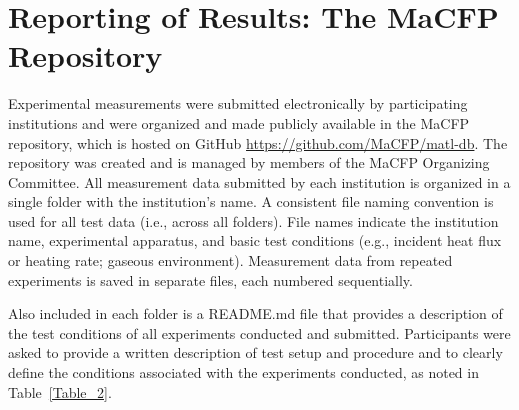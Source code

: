 \documentclass{book}
\begin{document}
\section{Reporting of Results: The MaCFP Repository}

Experimental measurements were submitted electronically by participating institutions and were organized and made publicly available in the MaCFP repository, which is hosted on GitHub \href{https://github.com/MaCFP/matl-db}{https://github.com/MaCFP/matl-db}. The repository was created and is managed by members of the MaCFP Organizing Committee. All measurement data submitted by each institution is organized in a single folder with the institution’s name. A consistent file naming convention is used for all test data (i.e., across all folders). File names indicate the institution name, experimental apparatus, and basic test conditions (e.g., incident heat flux or heating rate; gaseous environment). Measurement data from repeated experiments is saved in separate files, each numbered sequentially.

Also included in each folder is a README.md file that provides a description of the test conditions of all experiments conducted and submitted. Participants were asked to provide a written description of test setup and procedure and to clearly define the conditions associated with the experiments conducted, as noted in Table~\ref{Table_2}.
\end{document}
